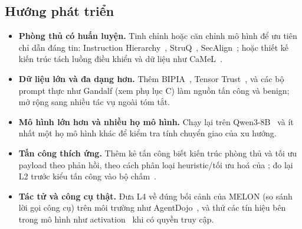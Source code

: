 \subsection{Hướng phát triển}
\begin{itemize}
  \item \textbf{Phòng thủ có huấn luyện.} Tinh chỉnh hoặc căn chỉnh mô hình để ưu tiên chỉ dẫn đáng tin: Instruction Hierarchy~\citep{wallace2024hierarchy}, StruQ~\citep{chen2025struq}, SecAlign~\citep{chen2025secalign}; hoặc thiết kế kiến trúc tách luồng điều khiển và dữ liệu như CaMeL~\citep{debenedetti2025camel}.
  \item \textbf{Dữ liệu lớn và đa dạng hơn.} Thêm BIPIA~\citep{yi2025bipia}, Tensor Trust~\citep{toyer2024tensortrust}, và các bộ prompt thực như Gandalf (xem phụ lục C) làm nguồn tấn công và benign; mở rộng sang nhiều tác vụ ngoài tóm tắt.
  \item \textbf{Mô hình lớn hơn và nhiều họ mô hình.} Chạy lại trên Qwen3-8B~\citep{yang2025qwen3} và ít nhất một họ mô hình khác để kiểm tra tính chuyển giao của xu hướng.
  \item \textbf{Tấn công thích ứng.} Thêm kẻ tấn công biết kiến trúc phòng thủ và tối ưu payload theo phản hồi, theo cách phân loại heuristic/tối ưu hoá của \citet{wang2026landscape}; đo lại L2 trước kiểu tấn công vào bộ chấm~\citep{choudhary2025hownot}.
  \item \textbf{Tác tử và công cụ thật.} Đưa L4 về đúng bối cảnh của MELON (so sánh lời gọi công cụ) trên môi trường như AgentDojo~\citep{debenedetti2024agentdojo}, và thử các tín hiệu bên trong mô hình như activation~\citep{abdelnabi2025drift} khi có quyền truy cập.
\end{itemize}
